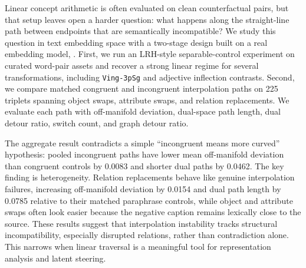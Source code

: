 Linear concept arithmetic is often evaluated on clean counterfactual pairs, but that setup leaves open a harder question: what happens along the straight-line path between endpoints that are semantically incompatible? We study this question in text embedding space with a two-stage design built on a real embedding model, \embmodel. First, we run an LRH-style separable-control experiment on curated word-pair assets and recover a strong linear regime for several transformations, including \texttt{Ving-3pSg} and adjective inflection contrasts. Second, we compare matched congruent and incongruent interpolation paths on 225 \sugarcrepe triplets spanning object swaps, attribute swaps, and relation replacements. We evaluate each path with off-manifold deviation, dual-space path length, dual detour ratio, switch count, and graph detour ratio.

The aggregate result contradicts a simple ``incongruent means more curved'' hypothesis: pooled incongruent paths have lower mean off-manifold deviation than congruent controls by 0.0083 and shorter dual paths by 0.0462. The key finding is heterogeneity. Relation replacements behave like genuine interpolation failures, increasing off-manifold deviation by 0.0154 and dual path length by 0.0785 relative to their matched paraphrase controls, while object and attribute swaps often look easier because the negative caption remains lexically close to the source. These results suggest that interpolation instability tracks structural incompatibility, especially disrupted relations, rather than contradiction alone. This narrows when linear traversal is a meaningful tool for representation analysis and latent steering.
